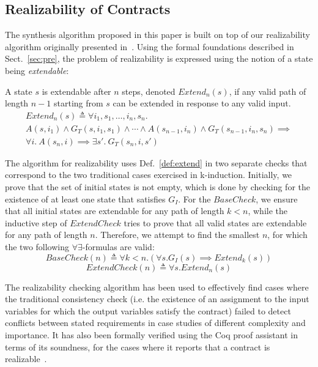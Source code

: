 \subsection{Realizability of Contracts}
The synthesis algorithm proposed in this paper is built on top of our realizability algorithm
originally presented in~\cite{Katis15:Realizability}. Using the formal foundations described in Sect.~\ref{sec:pre},
the problem of realizability is expressed using the notion of a state being \emph{extendable}:

\begin{definition}
\label{def:extend}
A state $s$ is extendable after $n$ steps, denoted $\mathit{Extend}_{n}(s)$, if
any valid path of length $n-1$ starting from $s$ can be extended in response to
any valid input.%
%
\begin{multline*}%
\mathit{Extend}_{n}(s) \triangleq \forall i_1, s_1, \ldots, i_n, s_n.\\ A(s, i_1) \land G_T(s, i_1, s_1)
\land \cdots \land
A(s_{n-1}, i_n) \land G_T(s_{n-1}, i_n, s_n)
\implies \\
\forall i.~ A(s_n, i) \implies \exists s'.~ G_T(s_n, i, s')
\end{multline*}
\end{definition}

The algorithm for realizability uses Def.~\ref{def:extend} in two
separate checks that correspond to the two traditional cases exercised
in k-induction. Initially, we prove that the set of initial states is
not empty, which is done by checking for the existence of at least one
state that satisfies $G_I$. For the $\mathit{BaseCheck}$, we ensure
that all initial states are extendable for any path of length $k < n$,
while the inductive step of $\mathit{ExtendCheck}$ tries to prove that
all valid states are extendable for any path of length $n$. Therefore,
we attempt to find the smallest $n$, for which the two following
$\forall\exists$-formulas are valid:%
%
\begin{equation}
\label{eq:sbcheck}
\mathit{BaseCheck}(n) \triangleq \forall k < n. (\forall s. G_I(s)
	  	\implies \mathit{Extend}_k(s))
\end{equation}%
%
\begin{equation}
\label{eq:echeck}
\mathit{ExtendCheck}(n) \triangleq \forall s. \mathit{Extend}_n(s)
\end{equation}

The realizability checking algorithm has been used to effectively find cases
where the traditional consistency check (i.e. the existence of an assignment
to the input variables for which the output variables satisfy the contract)
failed to detect conflicts between stated requirements in case studies of
different complexity and importance. It has also been formally verified using the Coq proof assistant in terms of its
soundness, for the cases where it reports that a contract is
realizable~\cite{katis2015machine}.

